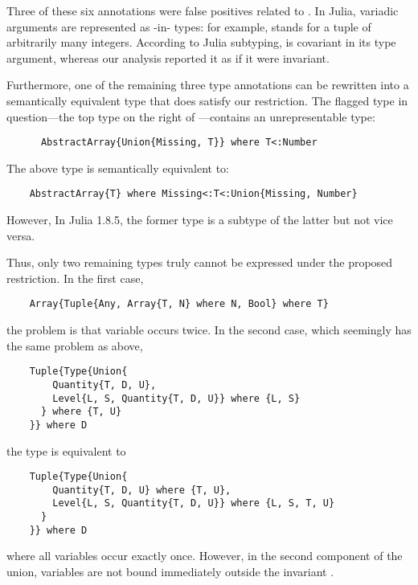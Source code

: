 Three of these six annotations %
were false positives related to . 
In Julia, variadic arguments are represented as
-in- types: for example, 
stands for a tuple of arbitrarily many integers. 
According to Julia subtyping,  is covariant in its type argument,
whereas our analysis reported it as if it were invariant.

Furthermore, one of the remaining three type annotations can be rewritten
into a semantically equivalent
type that does satisfy our restriction. The flagged type in 
question---the top  type on the right of
---contains an unrepresentable type:
\begin{codeenvd}
\begin{lstlisting}
      AbstractArray{Union{Missing, T}} where T<:Number
\end{lstlisting}
\end{codeenvd}
The above type is semantically equivalent to:
\begin{codeenvd}
\begin{lstlisting}
    AbstractArray{T} where Missing<:T<:Union{Missing, Number}
\end{lstlisting}
\end{codeenvd}
However, In Julia 1.8.5, the former type is a subtype of the latter
but not vice versa.

Thus, only two remaining types truly cannot be expressed under
the proposed restriction.
%
In the first case, 
\begin{codeenvd}
\begin{lstlisting}
    Array{Tuple{Any, Array{T, N} where N, Bool} where T}
\end{lstlisting}
\end{codeenvd}
the problem is that variable  occurs twice.
%
In the second case, which seemingly has the same problem as above,
\begin{codeenvd}
\begin{lstlisting}
    Tuple{Type{Union{
        Quantity{T, D, U}, 
        Level{L, S, Quantity{T, D, U}} where {L, S}
      } where {T, U}
    }} where D
\end{lstlisting}
\end{codeenvd}
the type is equivalent to
\begin{codeenvd}
\begin{lstlisting}
    Tuple{Type{Union{
        Quantity{T, D, U} where {T, U}, 
        Level{L, S, Quantity{T, D, U}} where {L, S, T, U}
      }
    }} where D
\end{lstlisting}
\end{codeenvd}
where all variables occur exactly once.
However, in the second component of the union, variables 
are not bound immediately outside the invariant .

